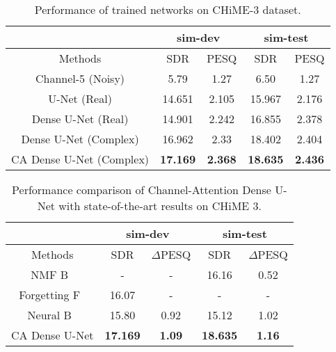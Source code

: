 \documentclass{article}
\begin{document}
\begin{table}[htb]
\setlength{\tabcolsep}{5pt}
\renewcommand{\arraystretch}{1.3}
\caption{Performance of trained networks on CHiME-3 dataset.}
\label{tab:res}
\centering
\begin{tabular}{c|c|c||c|c}
    \hline
    \hline
    \multirow{1}{*}{} &
      \multicolumn{2}{c}{sim-dev}  \vline &
      \multicolumn{2}{c}{sim-test} \\
     \hline
     Methods & SDR & PESQ & SDR & PESQ \\
     \hline
     Channel-5 (Noisy) &5.79 &1.27 &6.50 &1.27 \\
    \hline
    U-Net (Real) & 14.651 & 2.105 & 15.967 & 2.176 \\
    \hline
    Dense U-Net (Real) & 14.901 & 2.242 & 16.855 &  2.378 \\
    \hline
   Dense U-Net (Complex)& 16.962 & 2.33 & 18.402 &  2.404 \\
\hline
   CA Dense U-Net (Complex) & {\bf 17.169} & {\bf 2.368} &  {\bf 18.635} & {\bf 2.436}
\end{tabular}
\vspace{-6mm}
\end{table}
\begin{table}[htb]
\setlength{\tabcolsep}{5pt}
\renewcommand{\arraystretch}{1.3}
\caption{Performance comparison of Channel-Attention Dense U-Net with state-of-the-art results on CHiME 3.}
\label{tab:res_compare}
\centering
\begin{tabular}{c|c|c|c|c}
    \hline
    \hline
    \multirow{1}{*}{} &
      \multicolumn{2}{c}{sim-dev}  \vline &
      \multicolumn{2}{c}{sim-test} \\
	\hline
    Methods & SDR & $\Delta$PESQ & SDR & $\Delta$PESQ \\
    \hline
    NMF B~\cite{nmfb} & - & - & 16.16 & 0.52 \\
    \hline
    Forgetting F~\cite{forget} & 16.07 & - & - & -\\
    \hline
    Neural B~\cite{erdogan} & 15.80 & 0.92 & 15.12 & 1.02\\
    \hline
    CA Dense U-Net & {\bf 17.169} & {\bf 1.09} & {\bf18.635} & {\bf 1.16} \\
\end{tabular}
\vspace{-4mm}
\end{table}
 
\end{document}
